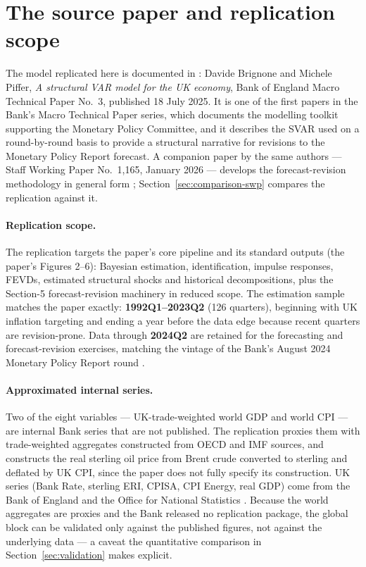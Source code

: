 \section{The source paper and replication scope}
\label{sec:source}

The model replicated here is documented in \citet{brignone2025}: Davide Brignone and Michele Piffer, \emph{A structural VAR model for the UK economy}, Bank of England Macro Technical Paper No.~3, published 18 July 2025. It is one of the first papers in the Bank's Macro Technical Paper series, which documents the modelling toolkit supporting the Monetary Policy Committee, and it describes the SVAR used on a round-by-round basis to provide a structural narrative for revisions to the Monetary Policy Report forecast. A companion paper by the same authors --- Staff Working Paper No.~1{,}165, January 2026 --- develops the forecast-revision methodology in general form \citep{brignone2026}; Section~\ref{sec:comparison-swp} compares the replication against it.

\paragraph{Replication scope.} The replication targets the paper's core pipeline and its standard outputs (the paper's Figures 2--6): Bayesian estimation, identification, impulse responses, FEVDs, estimated structural shocks and historical decompositions, plus the Section-5 forecast-revision machinery in reduced scope. The estimation sample matches the paper exactly: \textbf{1992Q1--2023Q2} (126 quarters), beginning with UK inflation targeting and ending a year before the data edge because recent quarters are revision-prone. Data through \textbf{2024Q2} are retained for the forecasting and forecast-revision exercises, matching the vintage of the Bank's August 2024 Monetary Policy Report round \citep{boe2024mpr}.

\paragraph{Approximated internal series.} Two of the eight variables --- UK-trade-weighted world GDP and world CPI --- are internal Bank series that are not published. The replication proxies them with trade-weighted aggregates constructed from OECD and IMF sources, and constructs the real sterling oil price from Brent crude converted to sterling and deflated by UK CPI, since the paper does not fully specify its construction. UK series (Bank Rate, sterling ERI, CPISA, CPI Energy, real GDP) come from the Bank of England and the Office for National Statistics \citep{ons2025gdp, ons2024cpi}. Because the world aggregates are proxies and the Bank released no replication package, the global block can be validated only against the published figures, not against the underlying data --- a caveat the quantitative comparison in Section~\ref{sec:validation} makes explicit.

